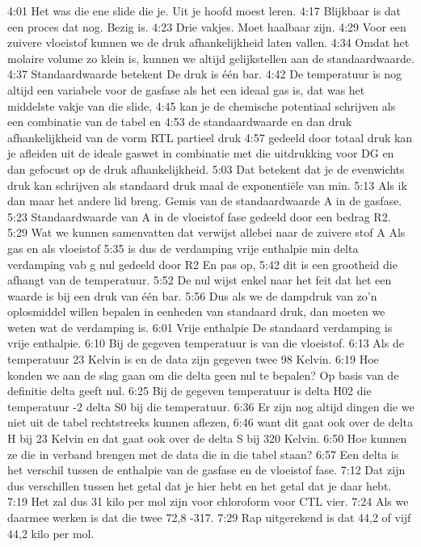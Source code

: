 4:01
Het was die ene slide die je. Uit je hoofd moest leren.
4:17
Blijkbaar is dat een proces dat nog. Bezig is.
4:23
Drie vakjes. Moet haalbaar zijn.
4:29
Voor een zuivere vloeistof kunnen we de druk afhankelijkheid laten vallen.
4:34
Omdat het molaire volume zo klein is, kunnen we altijd gelijkstellen aan de standaardwaarde.
4:37
Standaardwaarde betekent De druk is één bar.
4:42
De temperatuur is nog altijd een variabele voor de gasfase als het een ideaal gas is, dat was het middelste vakje van die slide,
4:45
kan je de chemische potentiaal schrijven als een combinatie van de tabel en
4:53
de standaardwaarde en dan druk afhankelijkheid van de vorm RTL partieel druk
4:57
gedeeld door totaal druk kan je afleiden uit de ideale gaswet in combinatie met die uitdrukking voor DG en dan gefocust op de druk afhankelijkheid.
5:03
Dat betekent dat je de evenwichts druk kan schrijven als standaard druk maal de exponentiële van min.
5:13
Als ik dan maar het andere lid breng. Gemis van de standaardwaarde A in de gasfase.
5:23
Standaardwaarde van A in de vloeistof fase gedeeld door een bedrag R2.
5:29
Wat we kunnen samenvatten dat verwijst allebei naar de zuivere stof A Als gas en als vloeistof
5:35
is dus de verdamping vrije enthalpie min delta verdamping vab g nul gedeeld door R2 En pas op,
5:42
dit is een grootheid die afhangt van de temperatuur.
5:52
De nul wijst enkel naar het feit dat het een waarde is bij een druk van één bar.
5:56
Dus als we de dampdruk van zo'n oplosmiddel willen bepalen in eenheden van standaard druk, dan moeten we weten wat de verdamping is.
6:01
Vrije enthalpie De standaard verdamping is vrije enthalpie.
6:10
Bij de gegeven temperatuur is van die vloeistof.
6:13
Als de temperatuur 23 Kelvin is en de data zijn gegeven twee 98 Kelvin.
6:19
Hoe konden we aan de slag gaan om die delta geen nul te bepalen? Op basis van de definitie delta geeft nul.
6:25
Bij de gegeven temperatuur is delta H02 die temperatuur -2 delta S0 bij die temperatuur.
6:36
Er zijn nog altijd dingen die we niet uit de tabel rechtstreeks kunnen aflezen,
6:46
want dit gaat ook over de delta H bij 23 Kelvin en dat gaat ook over de delta S bij 320 Kelvin.
6:50
Hoe kunnen ze die in verband brengen met de data die in die tabel staan?
6:57
Een delta is het verschil tussen de enthalpie van de gasfase en de vloeistof fase.
7:12
Dat zijn dus verschillen tussen het getal dat je hier hebt en het getal dat je daar hebt.
7:19
Het zal dus 31 kilo per mol zijn voor chloroform voor CTL vier.
7:24
Als we daarmee werken is dat die twee 72,8 -317.
7:29
Rap uitgerekend is dat 44,2 of vijf 44,2 kilo per mol.
